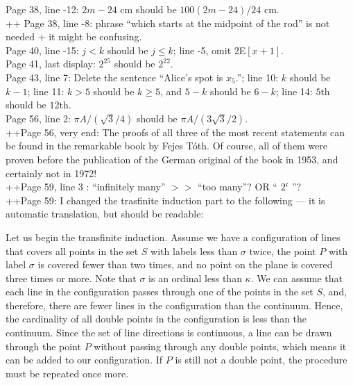 \documentclass[11pt]{article}
\begin{document}
Page 38, line -12: $2m-24$ cm should be $100(2m-24)/24$ cm.\\

++ Page 38, line -8: phrase ``which starts at the midpoint of the rod'' is not needed + it might be confusing.\\

Page 40, line -15: $j < k$ should be $j \le k$; line -5, omit 2E$[x+1]$.\\

Page 41, last display: $2^{25}$ should be $2^{22}$.\\

Page 43, line 7: Delete the sentence ``Alice's spot is $x_5$.'';
line 10: $k$ should be $k{-}1$;
line 11: $k>5$ should be $k\ge 5$, and $5{-}k$ should be $6{-}k$;
line 14: $5$th should be $12$th.\\

Page 56, line 2: $\pi A/(\sqrt{3}/4)$ should be $\pi A/(3\sqrt{3}/2)$.\\

++Page 56, very end: The proofs of all three of the most recent statements can be found in the remarkable book by Fejes Tóth. Of course, all of them were proven before the publication of the German original of the book in 1953, and certainly not in 1972!\\

++Page 59, line 3 : ``infinitely many'' $>>$ ``too many''? OR `` $2^{\mathfrak{c}}$ ''?\\

++Page 59: I changed the trasfinite induction part to the following --- it is automatic translation, but should be readable:

Let us begin the transfinite induction.
Assume we have a configuration of lines that covers all points in the set \( S \) with labels less than \( \sigma \) twice,
the point \( P \) with label \( \sigma \) is covered fewer than two times,
and no point on the plane is covered three times or more.
Note that \( \sigma \) is an ordinal less than \( \kappa \).
We can assume that each line in the configuration passes through one of the points in the set \( S \),
and, therefore, there are fewer lines in the configuration than the continuum.
Hence, the cardinality of all double points in the configuration is less than the continuum.
Since the set of line directions is continuous, a line can be drawn through the point \( P \) without passing through any double points,
which means it can be added to our configuration.
If \( P \) is still not a double point, the procedure must be repeated once more.\\
\end{document}
